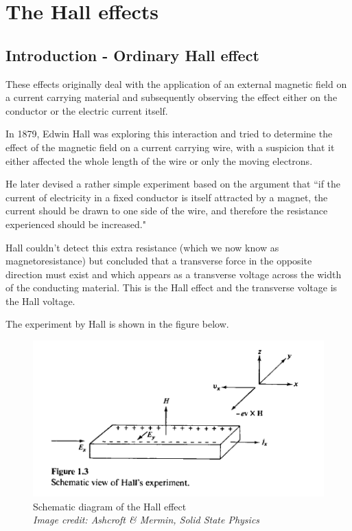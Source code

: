\chapter{The Hall effects}

\label{chapter2}

\section{Introduction - Ordinary Hall effect} \label{sec:ohe}

These effects originally deal with the application of an external magnetic field on a current carrying material and subsequently observing the effect either on the conductor or the electric current itself.

In 1879, Edwin Hall was exploring this interaction and tried to determine the effect of the magnetic field on a current carrying wire, with a suspicion that it either affected the whole length of the wire or only the moving electrons.

He later devised a rather simple experiment based on the argument that ``if the current of electricity in a fixed conductor is itself attracted by a magnet, the current should be drawn to one side of the wire, and therefore the resistance experienced should be increased." \cite{S.1880}

Hall couldn't detect this extra resistance (which we now know as magnetoresistance) but concluded that a transverse force in the opposite direction must exist and which appears as a transverse voltage across the width of the conducting material.
This is the Hall effect and the transverse voltage is the Hall voltage.

The experiment by Hall is shown in the figure below.

\begin{figure}[h!]
    \includegraphics[width=0.7\columnwidth]{hall-effect-ashcroft.png}
    \caption{Schematic diagram of the Hall effect\\ \textit{Image credit: Ashcroft \& Mermin, Solid State Physics}  }
    \label{hall-figure}
\end{figure}

